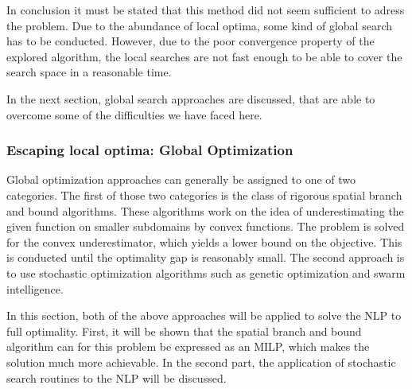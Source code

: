 \documentclass[a4paper, 12pt] {article}
\begin{document}
In conclusion it must be stated that this method did not seem sufficient to adress the problem. Due to the abundance of local optima, some kind of global search has to be conducted. However, due to the poor convergence property of the explored algorithm, the local searches are not fast enough to be able to cover the search space in a reasonable time. 

In the next section, global search approaches are discussed, that are able to overcome some of the difficulties we have faced here.
\subsubsection{Escaping local optima: Global Optimization}
\label{sec:nlp-formulation2}
Global optimization approaches can generally be assigned to one of two categories. The first of those two categories is the class of rigorous spatial branch and bound algorithms. These algorithms work on the idea of underestimating the given function on smaller subdomains by convex functions. The problem is solved for the convex underestimator, which yields a lower bound on the objective. This is conducted until the optimality gap is reasonably small. The second approach is to use stochastic optimization algorithms such as genetic optimization and swarm intelligence.

In this section, both of the above approaches will be applied to solve the NLP to full optimality. First, it will be shown that the spatial branch and bound algorithm can for this problem be expressed as an MILP, which makes the solution much more achievable. In the second part, the application of stochastic search routines to the NLP will be discussed.
\end{document}
